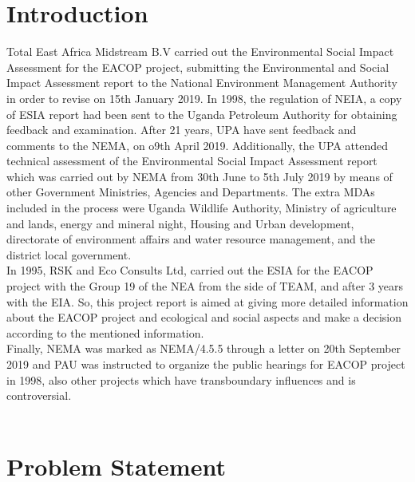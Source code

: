 \documentclass[12pt]{article}
\begin{document}
\section*{Introduction}

{\fontsize{12pt}{12pt}\selectfont 

\hspace*{1em}Total East Africa Midstream B.V carried out the Environmental Social Impact Assessment for the EACOP project, submitting the Environmental and Social Impact Assessment report to the National Environment Management Authority in order to revise on 15th January 2019. In 1998, the regulation of NEIA, a copy of ESIA report had been sent to the Uganda Petroleum Authority for obtaining feedback and examination. After 21 years, UPA have sent feedback and comments to the NEMA, on o9th April 2019. Additionally, the UPA attended technical assessment of the Environmental Social Impact Assessment report which was carried out by NEMA from 30th June to 5th July 2019 by means of other Government Ministries, Agencies and Departments. The extra MDAs included in the process were Uganda Wildlife Authority, Ministry of agriculture and lands, energy and mineral night, Housing and Urban development, directorate of environment affairs and water resource management, and the district local government.
\\

In 1995, RSK and Eco Consults Ltd, carried out the ESIA for the EACOP project with the Group 19 of the NEA from the side of TEAM, and after 3 years with the EIA. So, this project report is aimed at giving more detailed information about the EACOP project and ecological and social aspects and make a decision according to the mentioned information. 
\\

Finally, NEMA was marked as NEMA/4.5.5 through a letter on 20th September 2019 and PAU was instructed to organize the public hearings for EACOP project in 1998, also other projects which have transboundary influences and is controversial. 
\\
\\

}


\section*{Problem Statement}
\end{document}
